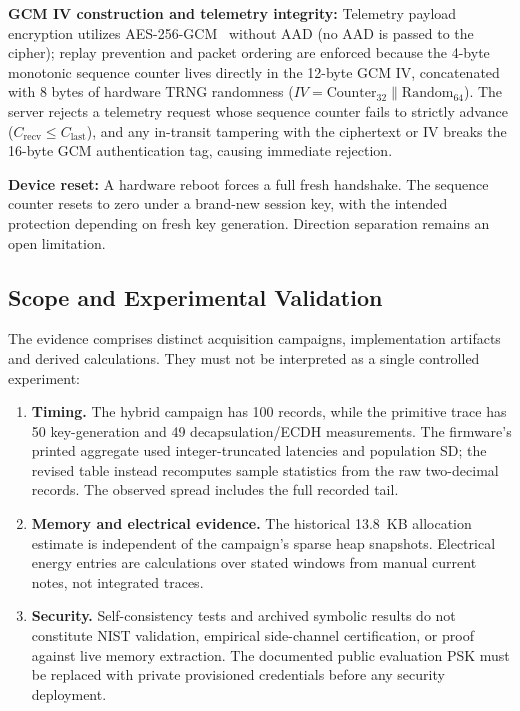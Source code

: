 \documentclass[journal, 10pt]{IEEEtran}
\begin{document}
\textbf{GCM IV construction and telemetry integrity:} Telemetry payload encryption utilizes AES-256-GCM~\cite{b22,b29,b35,b30} without AAD (no AAD is passed to the cipher); replay prevention and packet ordering are enforced because the 4-byte monotonic sequence counter lives directly in the 12-byte GCM IV, concatenated with 8 bytes of hardware TRNG randomness ($IV = \text{Counter}_{32} \parallel \text{Random}_{64}$). The server rejects a telemetry request whose sequence counter fails to strictly advance ($C_{\text{recv}} \leq C_{\text{last}}$), and any in-transit tampering with the ciphertext or IV breaks the 16-byte GCM authentication tag, causing immediate rejection.

\textbf{Device reset:} A hardware reboot forces a full fresh handshake. The sequence counter resets to zero under a brand-new session key, with the intended protection depending on fresh key generation. Direction separation remains an open limitation.

\subsection{Scope and Experimental Validation}
The evidence comprises distinct acquisition campaigns, implementation artifacts and derived calculations. They must not be interpreted as a single controlled experiment:
\begin{enumerate}
\item \textbf{Timing.} The hybrid campaign has 100 records, while the primitive trace has 50 key-generation and 49 decapsulation/ECDH measurements. The firmware's printed aggregate used integer-truncated latencies and population SD; the revised table instead recomputes sample statistics from the raw two-decimal records. The observed spread includes the full recorded tail.
\item \textbf{Memory and electrical evidence.} The historical 13.8~KB allocation estimate is independent of the campaign's sparse heap snapshots. Electrical energy entries are calculations over stated windows from manual current notes, not integrated traces.
\item \textbf{Security.} Self-consistency tests and archived symbolic results do not constitute NIST validation, empirical side-channel certification, or proof against live memory extraction. The documented public evaluation PSK must be replaced with private provisioned credentials before any security deployment.
\end{enumerate}
\end{document}
